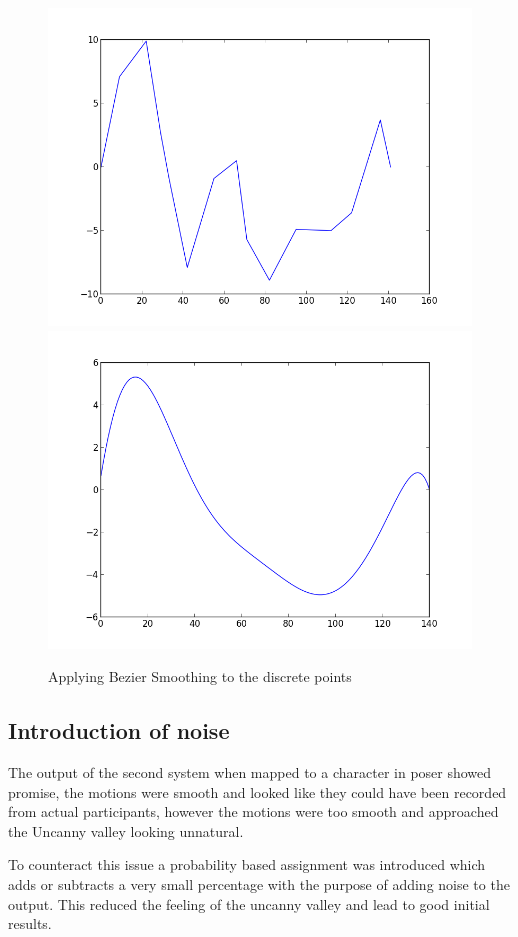 \documentclass[bsc,frontabs,twoside,singlespacing,parskip]{infthesis}
\begin{document}
\begin{figure}
	\includegraphics[width=.5\textwidth]{figure_1.png}
	\includegraphics[width=.5\textwidth]{figure_2.png}
	\caption{Applying Bezier Smoothing to the discrete points}
\end{figure}

\subsection{Introduction of noise}

The output of the second system when mapped to a character in poser showed promise, the motions were smooth and looked like they could have been recorded from actual participants, however the motions were too smooth and approached the Uncanny valley looking unnatural.

To counteract this issue a probability based assignment was introduced which adds or subtracts a very small percentage with the purpose of adding noise to the output. This reduced the feeling of the uncanny valley and lead to good initial results.
\end{document}
